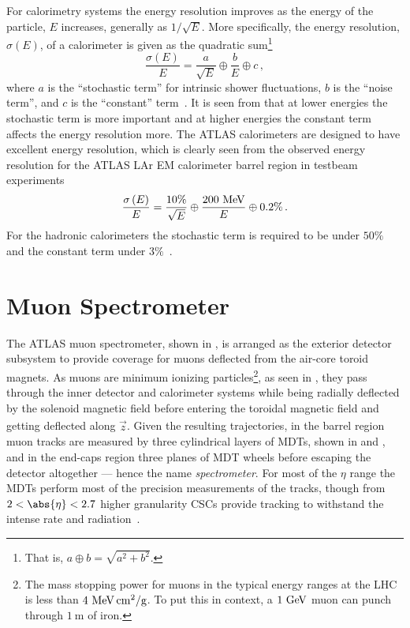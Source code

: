 For calorimetry systems the energy resolution improves as the energy of the particle, $E$ increases, generally as $1/\sqrt{E}$.
More specifically, the energy resolution, $\sigma\left(E\right)$, of a calorimeter is given as the quadratic sum\footnote{That is, $a \oplus b = \sqrt{a^{2} + b^{2}}$.}
\begin{equation}
 \frac{\sigma\left(E\right)}{E} = \frac{a}{\sqrt{E}} \oplus \frac{b}{E} \oplus c\,,
 \label{eq:calorimeter_energy_resolution}
\end{equation}
where $a$ is the ``stochastic term'' for intrinsic shower fluctuations, $b$ is the ``noise term'', and $c$ is the ``constant'' term~\cite{Fabjan:692252}.
It is seen from  that at lower energies the stochastic term is more important and at higher energies the constant term affects the energy resolution more.
The ATLAS calorimeters are designed to have excellent energy resolution, which is clearly seen from the observed energy resolution for the ATLAS LAr EM calorimeter barrel region in testbeam experiments~\cite{Ilic:2014,Aleksa:1547314}
\[
 \frac{\sigma\left(E\right)}{E} = \frac{10\%}{\sqrt{E}} \oplus \frac{200~\mathrm{MeV}}{E} \oplus 0.2\%\,.
\]
For the hadronic calorimeters the stochastic term is required to be under $50\%$ and the constant term under $3\%$~\cite{Ilic:2014}.

\section{Muon Spectrometer}\label{sec:ATLAS_muon_spectrometer}

The ATLAS muon spectrometer, shown in , is arranged as the exterior detector subsystem to provide coverage for muons deflected from the air-core toroid magnets.
As muons are minimum ionizing particles\footnote{The mass stopping power for muons in the typical energy ranges at the LHC is less than $4~\mathrm{MeV}\,\mathrm{cm}^{2}/\mathrm{g}$.
 To put this in context, a $1~\mathrm{GeV}$ muon can punch through $1~\mathrm{m}$ of iron.}, as seen in , they pass through the inner detector and calorimeter systems while being radially deflected by the solenoid magnetic field before entering the toroidal magnetic field and getting deflected along $\hat{\vec{z}}$.
Given the resulting trajectories, in the barrel region muon tracks are measured by three cylindrical layers of \glspl{MDT}, shown in  and , and in the end-caps region three planes of MDT wheels before escaping the detector altogether --- hence the name \emph{spectrometer}.
For most of the $\eta$ range the MDTs perform most of the precision measurements of the tracks, though from $2 < \abs{\eta} < 2.7$ higher granularity \glspl{CSC} provide tracking to withstand the intense rate and radiation~\cite{PERF-2007-01}.

